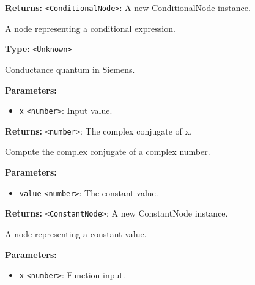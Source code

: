 \documentclass[12pt,a4paper]{article}
\begin{document}
\noindent \textbf{Returns:} \texttt{<ConditionalNode>}: A new ConditionalNode instance.

\noindent A node representing a conditional expression.

\vspace{5mm}
\noindent {}\vspace{4mm}


\noindent \textbf{Type:} \texttt{<Unknown>}

\noindent Conductance quantum in Siemens.

\vspace{5mm}
\noindent {}


\noindent \textbf{Parameters:}
\begin{itemize}
  \item \texttt{x} \texttt{<number>}: Input value.
\end{itemize}

\noindent \textbf{Returns:} \texttt{<number>}: The complex conjugate of x.

\noindent Compute the complex conjugate of a complex number.

\vspace{5mm}
\noindent {}


\noindent \textbf{Parameters:}
\begin{itemize}
  \item \texttt{value} \texttt{<number>}: The constant value.
\end{itemize}

\noindent \textbf{Returns:} \texttt{<ConstantNode>}: A new ConstantNode instance.

\noindent A node representing a constant value.

\vspace{5mm}
\noindent {}


\noindent \textbf{Parameters:}
\begin{itemize}
  \item \texttt{x} \texttt{<number>}: Function input.
\end{itemize}
\end{document}
